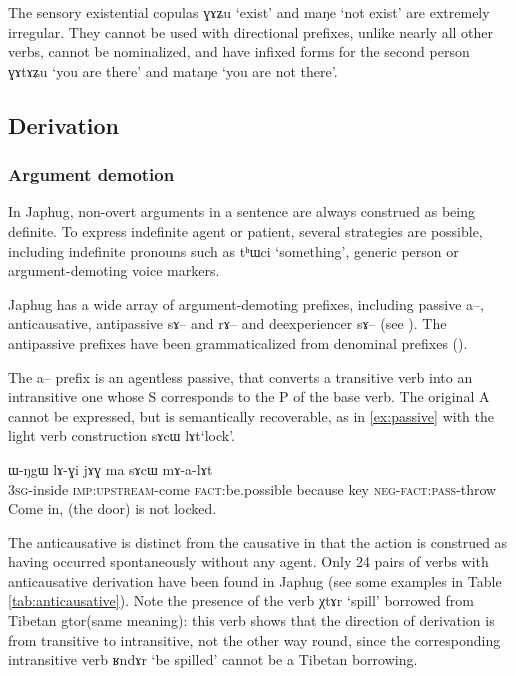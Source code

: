 \documentclass[oldfontcommands,oneside,a4paper,11pt]{article}
\newcommand{\ipa}[1]{{\phon #1}} %
\begin{document}
The sensory existential copulas \ipa{ɣɤʑu} `exist' and \ipa{maŋe} `not exist' are extremely irregular. They cannot be used with directional prefixes, unlike nearly all other verbs, cannot be nominalized, and have infixed forms for the second person \ipa{ɣɤtɤʑu} `you are there' and \ipa{mataŋe} `you are not there'.

\subsection{Derivation}


\subsubsection{Argument demotion}
In Japhug, non-overt arguments in a sentence are always construed as being definite. To express indefinite agent or patient, several strategies are possible, including indefinite pronouns such as \ipa{tʰɯci} `something', generic person or argument-demoting voice markers.

Japhug has a wide array of argument-demoting prefixes, including passive \ipa{a--}, anticausative, antipassive \ipa{sɤ--} and \ipa{rɤ--} and deexperiencer \ipa{sɤ--} (see \citealt{jacques12demotion}). The antipassive prefixes have been grammaticalized from denominal prefixes (\citealt{jacques14antipassive}).

The  \ipa{a--} prefix is an agentless passive, that converts a transitive verb into an intransitive one whose S corresponds to the P of the base verb. The original A cannot be expressed, but is semantically recoverable, as in \ref{ex:passive} with the light verb construction \ipa{sɤcɯ lɤt}`lock'. 

\begin{exe}
\ex \label{ex:passive}
\gll 
\ipa{ɯ-ŋgɯ} 	\ipa{lɤ-ɣi} 	\ipa{jɤɣ} 	\ipa{ma} 	\ipa{sɤcɯ} 	\ipa{mɤ-a-lɤt} \\
\textsc{3sg}-inside \textsc{imp:upstream}-come \textsc{fact}:be.possible because key \textsc{neg-fact:pass}-throw \\
\glt Come in, (the door) is not locked.
\end{exe}

The anticausative is distinct from the causative in that the action is construed as having occurred spontaneously without any agent. Only 24 pairs of verbs with anticausative derivation have been found in Japhug (see some examples in Table \ref{tab:anticausative}). Note the presence of the verb \ipa{χtɤr} `spill' borrowed from Tibetan \ipa{gtor}(same meaning): this verb shows that the direction of derivation is from transitive to intransitive, not the other way round, since the corresponding intransitive verb \ipa{ʁndɤr} `be spilled' cannot be a Tibetan borrowing.
\end{document}
